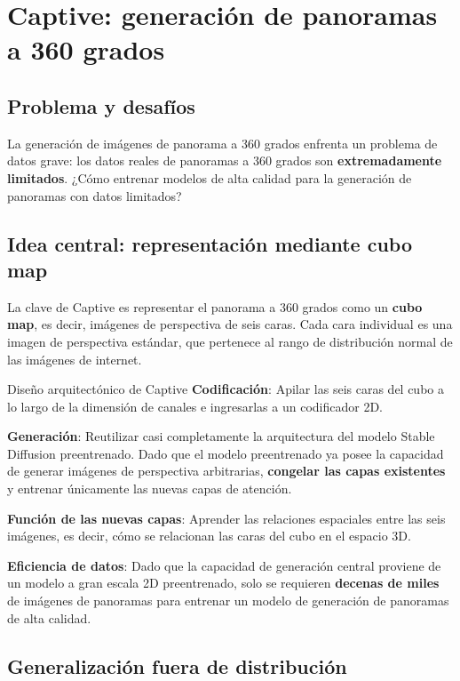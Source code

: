 \section{Captive: generación de panoramas a 360 grados}

\subsection{Problema y desafíos}

La generación de imágenes de panorama a 360 grados enfrenta un problema de datos grave: los datos reales de panoramas a 360 grados son \textbf{extremadamente limitados}. ¿Cómo entrenar modelos de alta calidad para la generación de panoramas con datos limitados?

\subsection{Idea central: representación mediante cubo map}

La clave de Captive es representar el panorama a 360 grados como un \textbf{cubo map}, es decir, imágenes de perspectiva de seis caras. Cada cara individual es una imagen de perspectiva estándar, que pertenece al rango de distribución normal de las imágenes de internet.

\begin{importantbox}{Diseño arquitectónico de Captive}
\textbf{Codificación}: Apilar las seis caras del cubo a lo largo de la dimensión de canales e ingresarlas a un codificador 2D.

\textbf{Generación}: Reutilizar casi completamente la arquitectura del modelo Stable Diffusion preentrenado. Dado que el modelo preentrenado ya posee la capacidad de generar imágenes de perspectiva arbitrarias, \textbf{congelar las capas existentes} y entrenar únicamente las nuevas capas de atención.

\textbf{Función de las nuevas capas}: Aprender las relaciones espaciales entre las seis imágenes, es decir, cómo se relacionan las caras del cubo en el espacio 3D.

\textbf{Eficiencia de datos}: Dado que la capacidad de generación central proviene de un modelo a gran escala 2D preentrenado, solo se requieren \textbf{decenas de miles} de imágenes de panoramas para entrenar un modelo de generación de panoramas de alta calidad.
\end{importantbox}

\subsection{Generalización fuera de distribución}

